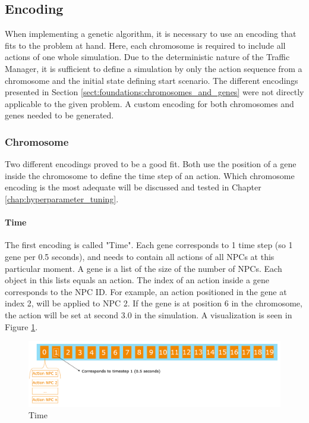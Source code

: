 \subsection{Encoding}
When implementing a genetic algorithm, it is necessary to use an encoding that fits to the problem at hand. 
Here, each chromosome is required to include all actions of one whole simulation. Due to the deterministic nature of the Traffic Manager, it is sufficient to define a simulation by only the action sequence from a chromosome and the initial state defining start scenario. The different encodings presented in Section \ref{sect:foundations:chromosomes_and_genes} were not directly applicable to the given problem. A custom encoding for both chromosomes and genes needed to be generated.

\subsubsection{Chromosome}
Two different encodings proved to be a good fit. Both use the position of a gene inside the chromosome to define the time step of an action. Which chromosome encoding is the most adequate will be discussed and tested in Chapter \ref{chap:hyperparameter_tuning}.

\paragraph{Time}
The first encoding is called "Time". Each gene corresponds to 1 time step (so 1 gene per 0.5 seconds), and needs to contain all actions of all NPCs at this particular moment. A gene is a list of the size of the number of NPCs. Each object in this lists equals an action. The index of an action inside a gene corresponds to the NPC ID. For example, an action positioned in the gene at index 2, will be applied to NPC 2. If the gene is at position 6 in the chromosome, the action will be set at second 3.0 in the simulation. A visualization is seen in Figure \ref{fig:implementation:encoding_chromosome_time}.

\begin{figure}[ht] 
	\includegraphics[width=1\linewidth]{figures/time_encoding}
	\caption{Time}
	\label{fig:implementation:encoding_chromosome_time}
\end{figure}

